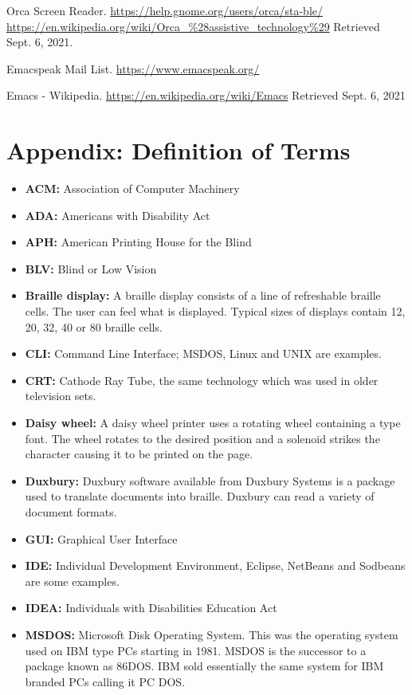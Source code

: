 \documentclass[11.5pt]{sig-alternate}
\begin{document}
\begin{large}
Orca Screen Reader. \url{https://help.gnome.org/users/orca/sta-ble/} \url{https://en.wikipedia.org/wiki/Orca\_\%28assistive\_technology\%29} Retrieved Sept. 6, 2021.
  
Emacspeak Mail List. \url{https://www.emacspeak.org/} 

Emacs - Wikipedia. \url{https://en.wikipedia.org/wiki/Emacs} Retrieved Sept. 6, 2021

\clearpage
\section*{Appendix: Definition of Terms}

\begin{itemize}
    \item \textbf{ACM:} Association of Computer Machinery
    \item \textbf{ADA:} Americans with Disability Act
    \item \textbf{APH:} American Printing House for the Blind
    \item \textbf{BLV:} Blind or Low Vision 
    \item \textbf{Braille display:} A braille display consists of a line of refreshable braille cells. The user can feel what is displayed. Typical sizes of displays contain 12, 20, 32, 40 or 80 braille cells.
    \item \textbf{CLI:} Command Line Interface; MSDOS, Linux and UNIX are examples.
    \item \textbf{CRT:} Cathode Ray Tube, the same technology which was used in older television sets.
    \item \textbf{Daisy wheel:} A daisy wheel printer uses a rotating wheel containing a type font. The wheel rotates to the desired position and a solenoid strikes the character causing it to be printed on the page.
    \item \textbf{Duxbury:} Duxbury software available from Duxbury Systems is a package used to translate documents into braille. Duxbury can read a variety of document formats.
    \item \textbf{GUI:} Graphical User Interface
    \item \textbf{IDE:} Individual Development Environment, Eclipse, NetBeans and Sodbeans are some examples.
    \item \textbf{IDEA:} Individuals with Disabilities Education Act
    \item \textbf{MSDOS:} Microsoft Disk Operating System. This was the operating system used on IBM type PCs starting in 1981. MSDOS is the successor to a package known as 86DOS. IBM sold essentially the same system for IBM branded PCs calling it PC DOS.

\end{itemize}
\end{large}
\end{document}
